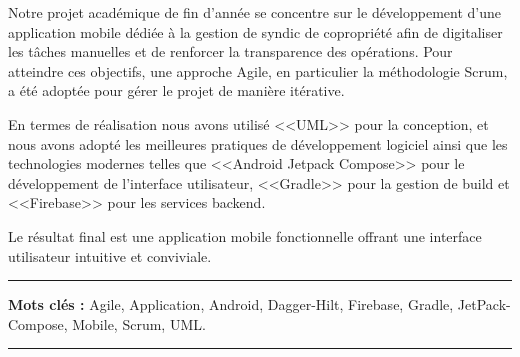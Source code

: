 Notre projet académique de fin d'année se concentre sur le développement d'une application mobile dédiée à la gestion de syndic de copropriété afin de digitaliser les tâches manuelles et de renforcer la transparence des opérations.
Pour atteindre ces objectifs, une approche Agile, en particulier la méthodologie Scrum, a été adoptée pour gérer le projet de manière itérative.

En termes de réalisation nous avons utilisé <<UML>> pour la conception, et nous avons adopté les meilleures pratiques de développement logiciel ainsi que les technologies modernes telles que  <<Android Jetpack Compose>> pour le développement de l'interface utilisateur, <<Gradle>> pour la gestion de build et <<Firebase>> pour les services backend.

Le résultat final est une application mobile fonctionnelle offrant une interface utilisateur intuitive et conviviale.
\vfill
\hrule
\vspace{0.5cm}
\textbf{Mots clés : } Agile, Application, Android, Dagger-Hilt, Firebase, Gradle, JetPack-Compose, Mobile, Scrum, UML.
\vspace{0.5cm}
\hrule
